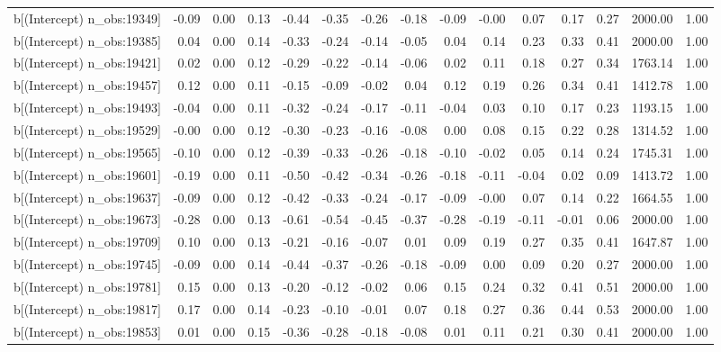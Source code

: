 \begin{table}[ht]
\begin{tabular}{rrrrrrrrrrrrrrr}
  b[(Intercept) n\_obs:19349] & -0.09 & 0.00 & 0.13 & -0.44 & -0.35 & -0.26 & -0.18 & -0.09 & -0.00 & 0.07 & 0.17 & 0.27 & 2000.00 & 1.00 \\ 
  b[(Intercept) n\_obs:19385] & 0.04 & 0.00 & 0.14 & -0.33 & -0.24 & -0.14 & -0.05 & 0.04 & 0.14 & 0.23 & 0.33 & 0.41 & 2000.00 & 1.00 \\ 
  b[(Intercept) n\_obs:19421] & 0.02 & 0.00 & 0.12 & -0.29 & -0.22 & -0.14 & -0.06 & 0.02 & 0.11 & 0.18 & 0.27 & 0.34 & 1763.14 & 1.00 \\ 
  b[(Intercept) n\_obs:19457] & 0.12 & 0.00 & 0.11 & -0.15 & -0.09 & -0.02 & 0.04 & 0.12 & 0.19 & 0.26 & 0.34 & 0.41 & 1412.78 & 1.00 \\ 
  b[(Intercept) n\_obs:19493] & -0.04 & 0.00 & 0.11 & -0.32 & -0.24 & -0.17 & -0.11 & -0.04 & 0.03 & 0.10 & 0.17 & 0.23 & 1193.15 & 1.00 \\ 
  b[(Intercept) n\_obs:19529] & -0.00 & 0.00 & 0.12 & -0.30 & -0.23 & -0.16 & -0.08 & 0.00 & 0.08 & 0.15 & 0.22 & 0.28 & 1314.52 & 1.00 \\ 
  b[(Intercept) n\_obs:19565] & -0.10 & 0.00 & 0.12 & -0.39 & -0.33 & -0.26 & -0.18 & -0.10 & -0.02 & 0.05 & 0.14 & 0.24 & 1745.31 & 1.00 \\ 
  b[(Intercept) n\_obs:19601] & -0.19 & 0.00 & 0.11 & -0.50 & -0.42 & -0.34 & -0.26 & -0.18 & -0.11 & -0.04 & 0.02 & 0.09 & 1413.72 & 1.00 \\ 
  b[(Intercept) n\_obs:19637] & -0.09 & 0.00 & 0.12 & -0.42 & -0.33 & -0.24 & -0.17 & -0.09 & -0.00 & 0.07 & 0.14 & 0.22 & 1664.55 & 1.00 \\ 
  b[(Intercept) n\_obs:19673] & -0.28 & 0.00 & 0.13 & -0.61 & -0.54 & -0.45 & -0.37 & -0.28 & -0.19 & -0.11 & -0.01 & 0.06 & 2000.00 & 1.00 \\ 
  b[(Intercept) n\_obs:19709] & 0.10 & 0.00 & 0.13 & -0.21 & -0.16 & -0.07 & 0.01 & 0.09 & 0.19 & 0.27 & 0.35 & 0.41 & 1647.87 & 1.00 \\ 
  b[(Intercept) n\_obs:19745] & -0.09 & 0.00 & 0.14 & -0.44 & -0.37 & -0.26 & -0.18 & -0.09 & 0.00 & 0.09 & 0.20 & 0.27 & 2000.00 & 1.00 \\ 
  b[(Intercept) n\_obs:19781] & 0.15 & 0.00 & 0.13 & -0.20 & -0.12 & -0.02 & 0.06 & 0.15 & 0.24 & 0.32 & 0.41 & 0.51 & 2000.00 & 1.00 \\ 
  b[(Intercept) n\_obs:19817] & 0.17 & 0.00 & 0.14 & -0.23 & -0.10 & -0.01 & 0.07 & 0.18 & 0.27 & 0.36 & 0.44 & 0.53 & 2000.00 & 1.00 \\ 
  b[(Intercept) n\_obs:19853] & 0.01 & 0.00 & 0.15 & -0.36 & -0.28 & -0.18 & -0.08 & 0.01 & 0.11 & 0.21 & 0.30 & 0.41 & 2000.00 & 1.00 \\ 

\end{tabular}
\end{table}
